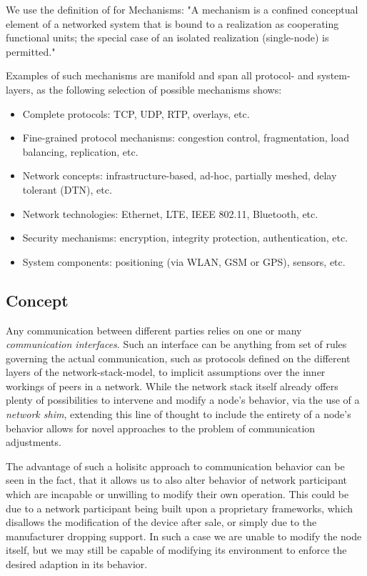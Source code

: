 We use the definition of \cite{} for Mechanisms: "A mechanism is a confined conceptual element of a networked system that is bound to a realization as cooperating functional units; the special case of an isolated realization (single-node) is permitted."

Examples of such mechanisms are manifold and span all protocol- and system-layers, as the following selection of possible mechanisms shows:

\begin{itemize}
 \item Complete protocols: TCP, UDP, RTP, overlays, etc.
 \item Fine-grained protocol mechanisms: congestion control, fragmentation, load balancing, replication, etc.
 \item Network concepts: infrastructure-based, ad-hoc, partially meshed, delay tolerant (DTN), etc.
 \item Network technologies: Ethernet, LTE, IEEE 802.11, Bluetooth, etc.
 \item Security mechanisms: encryption, integrity protection, authentication, etc.
 \item System components: positioning (via WLAN, GSM or GPS), sensors, etc.
\end{itemize}

\subsection{Concept}
\label{sec:design:concept}

Any communication between different parties relies on one or many \textit{communication interfaces}.
Such an interface can be anything from set of rules governing the actual communication, such as protocols defined on the different layers of the network-stack-model, to implicit assumptions over the inner workings of peers in a network.
While the network stack itself already offers plenty of possibilities to intervene and modify a node's behavior, via the use of a \textit{network shim}, extending this line of thought to include the entirety of a node's behavior allows for novel approaches to the problem of communication adjustments.

The advantage of such a holisitc approach to communication behavior can be seen in the fact, that it allows us to also alter behavior of network participant which are incapable or unwilling to modify their own operation.
This could be due to a network participant being built upon a proprietary frameworks, which disallows the modification of the device after sale, or simply due to the manufacturer dropping support.
In such a case we are unable to modify the node itself, but we may still be capable of modifying its environment to enforce the desired adaption in its behavior.

